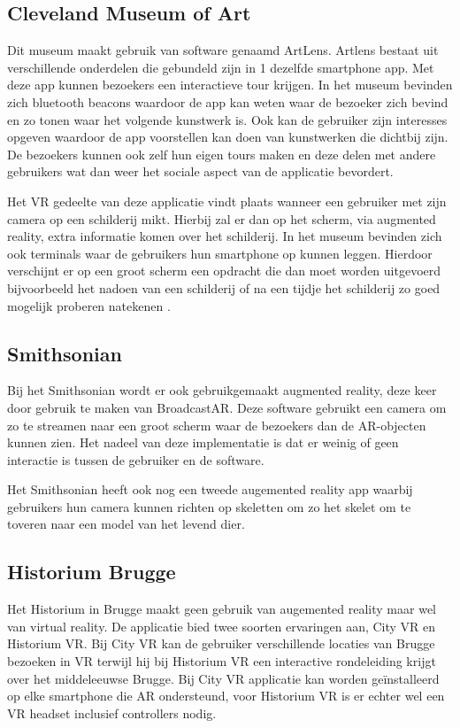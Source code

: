 \subsection{Cleveland Museum of Art}
Dit museum maakt gebruik van software genaamd ArtLens. Artlens bestaat uit verschillende onderdelen die gebundeld zijn in 1 dezelfde smartphone app. Met deze app kunnen bezoekers een interactieve tour krijgen. In het museum bevinden zich bluetooth beacons waardoor de app kan weten waar de bezoeker zich bevind en zo tonen waar het volgende kunstwerk is. Ook kan de gebruiker zijn interesses opgeven waardoor de app voorstellen kan doen van kunstwerken die dichtbij zijn. 
De bezoekers kunnen ook zelf hun eigen tours maken en deze delen met andere gebruikers wat dan weer het sociale aspect van de applicatie bevordert.

Het VR gedeelte van deze applicatie vindt plaats wanneer een gebruiker met zijn camera op een schilderij mikt. Hierbij zal er dan op het scherm, via augmented reality, extra informatie komen over het schilderij.
In het museum bevinden zich ook terminals waar de gebruikers hun smartphone op kunnen leggen. Hierdoor verschijnt er op een groot scherm een opdracht die dan moet worden uitgevoerd bijvoorbeeld het nadoen van een schilderij of na een tijdje het schilderij zo goed mogelijk proberen natekenen \autocite{Ding2017}.

\subsection{Smithsonian}
Bij het Smithsonian wordt er ook gebruikgemaakt augmented reality, deze keer door gebruik te maken van BroadcastAR. Deze software gebruikt een camera om zo te streamen naar een groot scherm waar de bezoekers dan de AR-objecten kunnen zien. Het nadeel van deze implementatie is dat er weinig of geen interactie is tussen de gebruiker en de software. 

Het Smithsonian heeft ook nog een tweede augemented reality app waarbij gebruikers hun camera kunnen richten op skeletten om zo het skelet om te toveren naar een model van het levend dier.

\subsection{Historium Brugge}
Het Historium in Brugge maakt geen gebruik van augemented reality maar wel van virtual reality. De applicatie bied twee soorten ervaringen aan, City VR en Historium VR. Bij City VR kan de gebruiker verschillende locaties van Brugge bezoeken in VR terwijl hij bij Historium VR een interactive rondeleiding krijgt over het middeleeuwse Brugge. Bij City VR applicatie kan worden geïnstalleerd op elke smartphone die AR ondersteund, voor Historium VR is er echter wel een VR headset inclusief controllers nodig. 


